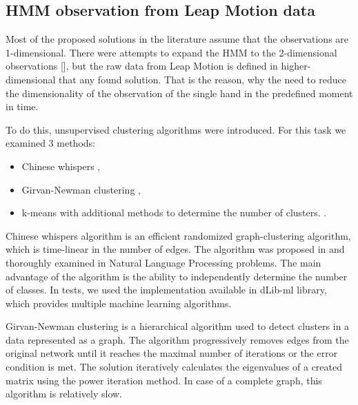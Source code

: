 \subsection{HMM observation from Leap Motion data}

Most of the proposed solutions in the literature assume that the observations are 1-dimensional.
There were attempts to expand the HMM to the 2-dimensional observations [], but the raw data from Leap Motion is defined in higher-dimensional that any found solution.
That is the reason, why the need to reduce the dimensionality of the observation of the single hand in the predefined moment in time.

To do this, unsupervised clustering algorithms were introduced. 
For this task we examined 3 methods:
\begin{itemize}
\item Chinese whispers \cite{CW1, CW2},
\item Girvan-Newman clustering \cite{Newman},
\item k-means with additional methods to determine the number of clusters. \cite{kmeans1, kmeans2}.
\end{itemize}

Chinese whispers algorithm is an efficient randomized graph-clustering algorithm, which is time-linear in the number of edges.
The algorithm was proposed in \cite{CW1} and thoroughly examined in Natural Language Processing problems. 
The main advantage of the algorithm is the ability to independently determine the number of classes. 
In tests, we used the implementation available in dLib-ml library\cite{dlib}, which provides multiple machine learning algorithms.

Girvan-Newman clustering is a hierarchical algorithm used to detect clusters in a data represented as a graph.
The algorithm progressively removes edges from the original network until it reaches the maximal number of iterations or the error condition is met.
The solution iteratively calculates the eigenvalues of a created matrix using the power iteration method. 
In case of a complete graph, this algorithm is relatively slow.

